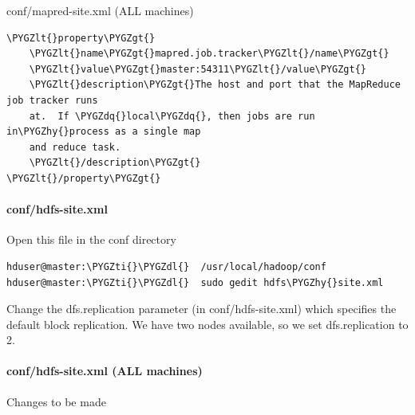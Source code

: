 \documentclass[letterpaper,10pt,english]{sphinxmanual}
\def\PYGZlt{\char`\<}
\def\PYGZgt{\char`\>}
\def\PYGZdl{\char`\$}
\def\PYGZhy{\char`\-}
\def\PYGZdq{\char`\"}
\def\PYGZti{\char`\~}
\begin{document}
conf/mapred-site.xml (ALL machines)

\begin{Verbatim}[commandchars=\\\{\}]
\PYGZlt{}property\PYGZgt{}
    \PYGZlt{}name\PYGZgt{}mapred.job.tracker\PYGZlt{}/name\PYGZgt{}
    \PYGZlt{}value\PYGZgt{}master:54311\PYGZlt{}/value\PYGZgt{}
    \PYGZlt{}description\PYGZgt{}The host and port that the MapReduce job tracker runs
    at.  If \PYGZdq{}local\PYGZdq{}, then jobs are run in\PYGZhy{}process as a single map
    and reduce task.
    \PYGZlt{}/description\PYGZgt{}
\PYGZlt{}/property\PYGZgt{}
\end{Verbatim}
\begin{figure}[htbp]
\centering

\end{figure}


\paragraph{conf/hdfs-site.xml}
\label{hadoop:conf-hdfs-site-xml}
Open this file in the conf directory

\begin{Verbatim}[commandchars=\\\{\}]
hduser@master:\PYGZti{}\PYGZdl{}  /usr/local/hadoop/conf
hduser@master:\PYGZti{}\PYGZdl{}  sudo gedit hdfs\PYGZhy{}site.xml
\end{Verbatim}

Change the dfs.replication parameter (in conf/hdfs-site.xml) which specifies the default block replication.
We have two nodes available, so we set dfs.replication to 2.


\paragraph{conf/hdfs-site.xml (ALL machines)}
\label{hadoop:conf-hdfs-site-xml-all-machines}
Changes to be made
\end{document}
